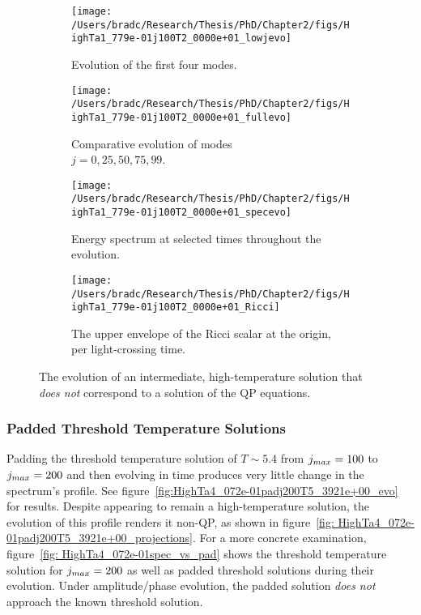 \documentclass[../PhD.tex]{subfiles}
\begin{document}
\begin{figure}[h]
	\centering
	\begin{subfigure}[t]{0.45\textwidth}
		\texttt{[image: /Users/bradc/Research/Thesis/PhD/Chapter2/figs/HighTa1\_779e-01j100T2\_0000e+01\_lowjevo]}
		\caption{Evolution of the first four modes.}
	\end{subfigure}
	\;
	\begin{subfigure}[t]{0.45\textwidth}
		\texttt{[image: /Users/bradc/Research/Thesis/PhD/Chapter2/figs/HighTa1\_779e-01j100T2\_0000e+01\_fullevo]}
		\caption{Comparative evolution of modes\\ $j=0, 25, 50, 75, 99$.}
	\end{subfigure}
	\;
	\begin{subfigure}[t]{0.45\textwidth}
		\texttt{[image: /Users/bradc/Research/Thesis/PhD/Chapter2/figs/HighTa1\_779e-01j100T2\_0000e+01\_specevo]}
		\caption{Energy spectrum at selected times throughout the evolution.}
	\end{subfigure}
	\;
	\begin{subfigure}[t]{0.45\textwidth}
		\texttt{[image: /Users/bradc/Research/Thesis/PhD/Chapter2/figs/HighTa1\_779e-01j100T2\_0000e+01\_Ricci]}
		\caption{The upper envelope of the Ricci scalar at the origin, per light-crossing time.}
	\end{subfigure}
	\caption{The evolution of an intermediate, high-temperature solution that \emph{does not} correspond to a solution of the QP equations.}
	\label{fig:HighTa1_779e-01j100T2_0000e+01evo}
\end{figure}


\subsubsection{Padded Threshold Temperature Solutions}

Padding the threshold temperature solution of $T \sim 5.4$ from $j_{max} = 100$ to $j_{max} = 200$ and then evolving in time produces very little change in the spectrum's profile. See figure~\ref{fig:HighTa4_072e-01padj200T5_3921e+00_evo} for results. Despite appearing to remain a high-temperature solution, the evolution of this profile renders it non-QP, as shown in figure~\ref{fig: HighTa4_072e-01padj200T5_3921e+00_projections}. For a more concrete examination, figure~\ref{fig: HighTa4_072e-01spec_vs_pad} shows the threshold temperature solution for $j_{max} = 200$ as well as padded threshold solutions during their evolution. Under amplitude/phase evolution, the padded solution \emph{does not} approach the known threshold solution.
\end{document}
